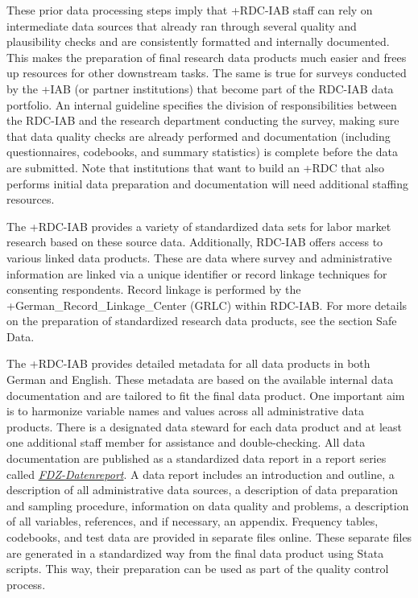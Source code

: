 \documentclass[
]{WileySix}
\begin{document}
These prior data processing steps imply that +RDC-IAB\textbar{} staff can rely on intermediate data sources that already ran through several quality and plausibility checks and are consistently formatted and internally documented. This makes the preparation of final research data products much easier and frees up resources for other downstream tasks. The same is true for surveys conducted by the +IAB\textbar{} (or partner institutions) that become part of the RDC-IAB data portfolio. An internal guideline specifies the division of responsibilities between the RDC-IAB and the research department conducting the survey, making sure that data quality checks are already performed and documentation (including questionnaires, codebooks, and summary statistics) is complete before the data are submitted. Note that institutions that want to build an +RDC\textbar{} that also performs initial data preparation and documentation will need additional staffing resources.

The +RDC-IAB\textbar{} provides a variety of standardized data sets for labor market research based on these source data. Additionally, RDC-IAB offers access to various linked data products. These are data where survey and administrative information are linked via a unique identifier or record linkage techniques for consenting respondents. Record linkage is performed by the +German\_Record\_Linkage\_Center\textbar{} (GRLC) within RDC-IAB. For more details on the preparation of standardized research data products, see the section Safe Data.

The +RDC-IAB\textbar{} provides detailed metadata for all data products in both German and English. These metadata are based on the available internal data documentation and are tailored to fit the final data product. One important aim is to harmonize variable names and values across all administrative data products. There is a designated data steward for each data product and at least one additional staff member for assistance and double-checking. All data documentation are published as a standardized data report in a report series called \href{https://fdz.iab.de/en/FDZ_Publications/FDZ_Publication_Series/FDZ-Datenreporte.aspx}{\emph{FDZ-Datenreport}}. A data report includes an introduction and outline, a description of all administrative data sources, a description of data preparation and sampling procedure, information on data quality and problems, a description of all variables, references, and if necessary, an appendix. Frequency tables, codebooks, and test data are provided in separate files online. These separate files are generated in a standardized way from the final data product using Stata scripts. This way, their preparation can be used as part of the quality control process.
\end{document}
